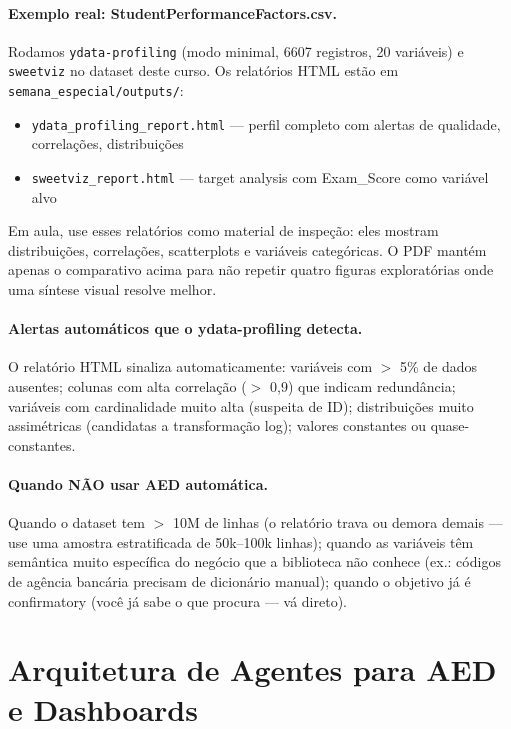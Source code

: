 \paragraph{Exemplo real: StudentPerformanceFactors.csv.}

Rodamos \texttt{ydata-profiling} (modo minimal, 6607 registros, 20 variáveis) e \texttt{sweetviz} no dataset deste curso. Os relatórios HTML estão em \texttt{semana\_especial/outputs/}:
\begin{itemize}
  \item \texttt{ydata\_profiling\_report.html} --- perfil completo com alertas de qualidade, correlações, distribuições
  \item \texttt{sweetviz\_report.html} --- target analysis com Exam\_Score como variável alvo
\end{itemize}

Em aula, use esses relatórios como material de inspeção: eles mostram distribuições, correlações, scatterplots e variáveis categóricas. O PDF mantém apenas o comparativo acima para não repetir quatro figuras exploratórias onde uma síntese visual resolve melhor.

\paragraph{Alertas automáticos que o ydata-profiling detecta.}
O relatório HTML sinaliza automaticamente: variáveis com $>$ 5\% de dados ausentes; colunas com alta correlação ($>$ 0,9) que indicam redundância; variáveis com cardinalidade muito alta (suspeita de ID); distribuições muito assimétricas (candidatas a transformação log); valores constantes ou quase-constantes.

\paragraph{Quando NÃO usar AED automática.}
Quando o dataset tem $>$ 10M de linhas (o relatório trava ou demora demais --- use uma amostra estratificada de 50k--100k linhas); quando as variáveis têm semântica muito específica do negócio que a biblioteca não conhece (ex.: códigos de agência bancária precisam de dicionário manual); quando o objetivo já é confirmatory (você já sabe o que procura --- vá direto).

\section{Arquitetura de Agentes para AED e Dashboards}
\label{sec:agentes}

